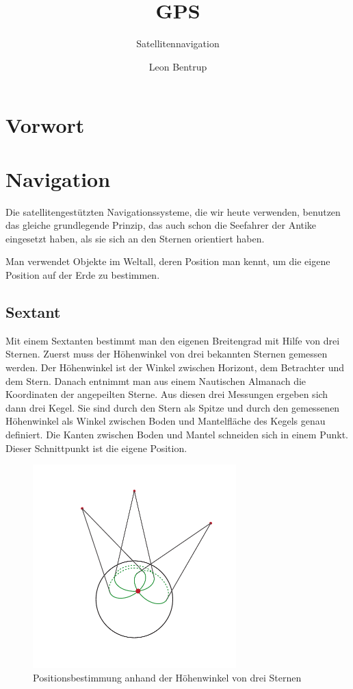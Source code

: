 \documentclass[12pt,a4paper]{scrartcl}
\author{Leon Bentrup}
\title{GPS}
\subtitle{Satellitennavigation}
\begin{document}
\maketitle
\tableofcontents
\newpage
{}

\section{Vorwort}
\section{Navigation}
Die satellitengestützten Navigationssysteme, die wir heute verwenden, benutzen das gleiche grundlegende Prinzip, das auch schon die Seefahrer der Antike eingesetzt haben, als sie sich an den Sternen orientiert haben.

Man verwendet Objekte im Weltall, deren Position man kennt, um die eigene Position auf der Erde zu bestimmen.

\subsection{Sextant}
Mit einem Sextanten bestimmt man den eigenen Breitengrad mit Hilfe von drei Sternen.
Zuerst muss der Höhenwinkel von drei bekannten Sternen gemessen werden. Der Höhenwinkel ist der Winkel zwischen Horizont, dem Betrachter und dem Stern.
Danach entnimmt man aus einem Nautischen Almanach die Koordinaten der angepeilten Sterne. Aus diesen drei Messungen ergeben sich dann drei Kegel. Sie sind durch den Stern als Spitze und durch den gemessenen Höhenwinkel als Winkel zwischen Boden und Mantelfläche des Kegels genau definiert. Die Kanten zwischen Boden und Mantel schneiden sich in einem Punkt. Dieser Schnittpunkt ist die eigene Position.

\begin{figure}[H]
\centering
\includegraphics[width=0.7\textwidth]{img/earth_cones.pdf}
\caption{Positionsbestimmung anhand der Höhenwinkel von drei Sternen}
\end{figure}
\end{document}
